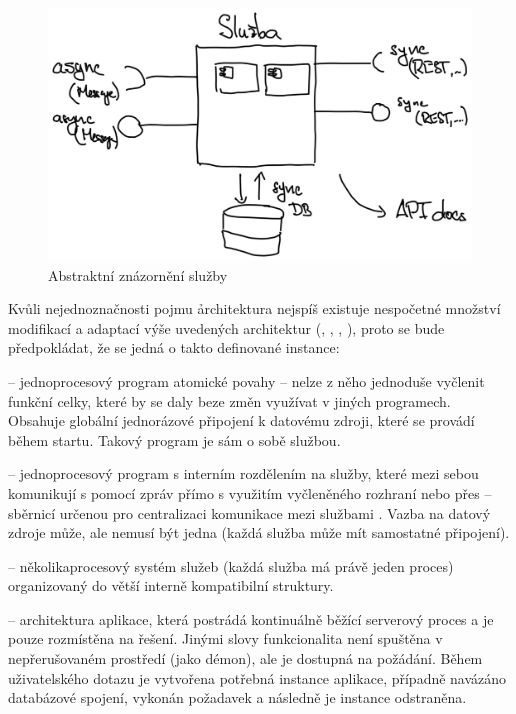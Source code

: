 \begin{figure}[htbp]
   \centering
   \includegraphics[max width=\textwidth]{assets/draft-service}
   \caption{Abstraktní znázornění služby}\label{fig:service-abstract}
\end{figure}


Kvůli nejednoznačnosti pojmu \h{architektura} nejspíš existuje nespočetné množství modifikací a adaptací výše uvedených architektur (, , , ), proto se bude předpokládat, že se jedná o takto definované instance:

\begin{dl}
   \item[\g{MA}] – jednoprocesový program atomické povahy – nelze z něho jednoduše vyčlenit funkční celky, které by se daly beze změn využívat v jiných programech.
   Obsahuje globální jednorázové připojení k datovému zdroji, které se provádí během startu.
   Takový program je sám o sobě službou.
   \item[\g{SOA}] – jednoprocesový program s interním rozdělením na služby, které mezi sebou komunikují s pomocí zpráv přímo s využitím vyčleněného rozhraní nebo přes  – sběrnicí určenou pro centralizaci komunikace mezi službami .
   Vazba na datový zdroje může, ale nemusí být jedna (každá služba může mít samostatné připojení).
   \item[\g{MSA}] – několikaprocesový systém služeb (každá služba má právě jeden proces) organizovaný do větší interně kompatibilní struktury.
   \item[\g{SA}] – architektura aplikace, která postrádá kontinuálně běžící serverový proces a je pouze rozmístěna na  řešení.
   Jinými slovy funkcionalita není spuštěna v nepřerušovaném prostředí (jako démon), ale je dostupná na požádání.
   Během uživatelského dotazu je vytvořena potřebná instance aplikace, případně navázáno databázové spojení, vykonán požadavek a následně je instance odstraněna.
\end{dl}










